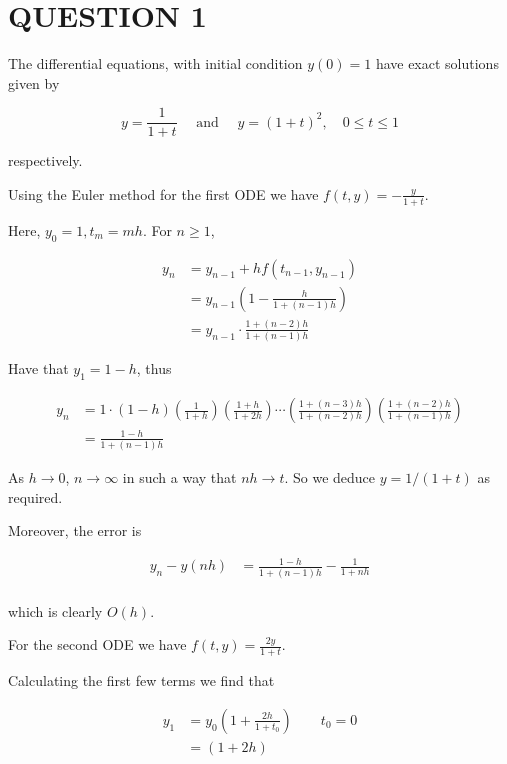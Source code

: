 \documentclass[a4paper]{article}
\begin{document}
	
\maketitle

\section{QUESTION 1}

The differential equations, with initial condition $ y(0)= 1 $ have exact solutions given by

\[ y = \frac{1}{1+t} \quad \text{ and } \quad y = (1 + t)^{2}, \quad 0 \leq t \leq 1\]

respectively.

Using the Euler method for the first ODE we have $ f(t,y) = -\frac{y}{1+t} $.

Here, $ y_{0} = 1, t_{m} = mh$. For $ n \geq 1 $,

\begin{align*}
y_{n} & = y_{n-1} + h f(t_{n-1},y_{n-1}) \\
& = y_{n-1} \left(  1 - \frac{h}{1+(n-1)h} \right)  \\
& = y_{n-1} \cdot \frac{1 + (n-2)h}{1 + (n-1)h} 
\end{align*}

Have that $ y_{1} = 1 - h $, thus

\begin{align*}
y_{n} & =  1 \cdot (1-h) \left( \frac{1}{1+h} \right)\left( \frac{1+h}{1+2h} \right) \cdots \left(  \frac{1 + (n-3)h}{1 + (n-2)h}  \right)   \left( \frac{1 + (n-2)h}{1 + (n-1)h}  \right)  \\
& = \frac{1-h}{1 + (n-1)h}
\end{align*}

As $  h \to 0 $, $ n \to \infty $ in such a way that $ nh \to t $. So we deduce $ y = 1/(1+t) $ as required.

Moreover, the error is 


\begin{align*}
y_{n} - y(nh) & = \frac{1-h}{1 + (n-1)h} - \frac{1}{1+nh} \\
\end{align*}

which is clearly $ O(h) $.




For the second ODE we have $ f(t,y) = \frac{2y}{1+t} $.

Calculating the first few terms we find that

\begin{align*}
y_{1} & = y_{0} \left(  1 + \frac{2h}{1+t_{0}} \right) \qquad t_{0} = 0 \\
& = (1+2h)
\end{align*}
\end{document}
